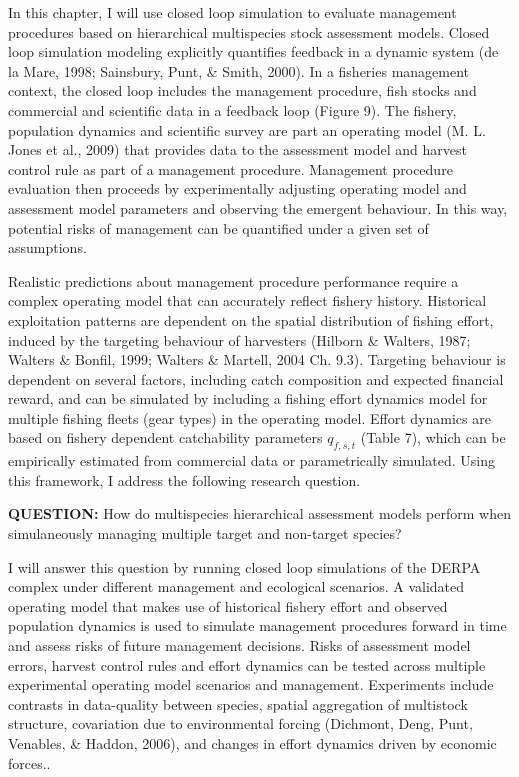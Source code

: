 \documentclass[12pt,]{scrartcl}
\begin{document}
In this chapter, I will use closed loop simulation to evaluate
management procedures based on hierarchical multispecies stock
assessment models. Closed loop simulation modeling explicitly quantifies
feedback in a dynamic system (de la Mare, 1998; Sainsbury, Punt, \&
Smith, 2000). In a fisheries management context, the closed loop
includes the management procedure, fish stocks and commercial and
scientific data in a feedback loop (Figure 9). The fishery, population
dynamics and scientific survey are part an operating model (M. L. Jones
et al., 2009) that provides data to the assessment model and harvest
control rule as part of a management procedure. Management procedure
evaluation then proceeds by experimentally adjusting operating model and
assessment model parameters and observing the emergent behaviour. In
this way, potential risks of management can be quantified under a given
set of assumptions.

Realistic predictions about management procedure performance require a
complex operating model that can accurately reflect fishery history.
Historical exploitation patterns are dependent on the spatial
distribution of fishing effort, induced by the targeting behaviour of
harvesters (Hilborn \& Walters, 1987; Walters \& Bonfil, 1999; Walters
\& Martell, 2004 Ch. 9.3). Targeting behaviour is dependent on several
factors, including catch composition and expected financial reward, and
can be simulated by including a fishing effort dynamics model for
multiple fishing fleets (gear types) in the operating model. Effort
dynamics are based on fishery dependent catchability parameters
\(q_{f,s,t}\) (Table 7), which can be empirically estimated from
commercial data or parametrically simulated. Using this framework, I
address the following research question.

\textbf{QUESTION:} How do multispecies hierarchical assessment models
perform when simulaneously managing multiple target and non-target
species?

I will answer this question by running closed loop simulations of the
DERPA complex under different management and ecological scenarios. A
validated operating model that makes use of historical fishery effort
and observed population dynamics is used to simulate management
procedures forward in time and assess risks of future management
decisions. Risks of assessment model errors, harvest control rules and
effort dynamics can be tested across multiple experimental operating
model scenarios and management. Experiments include contrasts in
data-quality between species, spatial aggregation of multistock
structure, covariation due to environmental forcing (Dichmont, Deng,
Punt, Venables, \& Haddon, 2006), and changes in effort dynamics driven
by economic forces..
\end{document}
